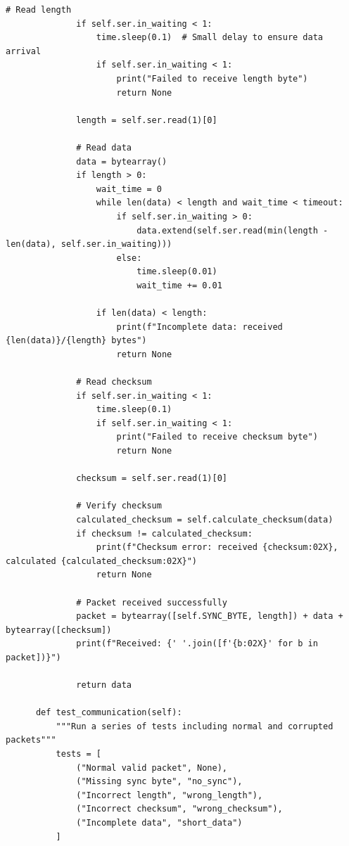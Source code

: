 \documentclass{article}
\begin{document}
\begin{lstlisting}[caption={client}, label={lst:example}]
              # Read length
              if self.ser.in_waiting < 1:
                  time.sleep(0.1)  # Small delay to ensure data arrival
                  if self.ser.in_waiting < 1:
                      print("Failed to receive length byte")
                      return None
                      
              length = self.ser.read(1)[0]
              
              # Read data
              data = bytearray()
              if length > 0:
                  wait_time = 0
                  while len(data) < length and wait_time < timeout:
                      if self.ser.in_waiting > 0:
                          data.extend(self.ser.read(min(length - len(data), self.ser.in_waiting)))
                      else:
                          time.sleep(0.01)
                          wait_time += 0.01
                          
                  if len(data) < length:
                      print(f"Incomplete data: received {len(data)}/{length} bytes")
                      return None
                      
              # Read checksum
              if self.ser.in_waiting < 1:
                  time.sleep(0.1)
                  if self.ser.in_waiting < 1:
                      print("Failed to receive checksum byte")
                      return None
                      
              checksum = self.ser.read(1)[0]
              
              # Verify checksum
              calculated_checksum = self.calculate_checksum(data)
              if checksum != calculated_checksum:
                  print(f"Checksum error: received {checksum:02X}, calculated {calculated_checksum:02X}")
                  return None
                  
              # Packet received successfully
              packet = bytearray([self.SYNC_BYTE, length]) + data + bytearray([checksum])
              print(f"Received: {' '.join([f'{b:02X}' for b in packet])}")
              
              return data
      
      def test_communication(self):
          """Run a series of tests including normal and corrupted packets"""
          tests = [
              ("Normal valid packet", None),
              ("Missing sync byte", "no_sync"),
              ("Incorrect length", "wrong_length"),
              ("Incorrect checksum", "wrong_checksum"),
              ("Incomplete data", "short_data")
          ]
          

\end{lstlisting}
\end{document}
